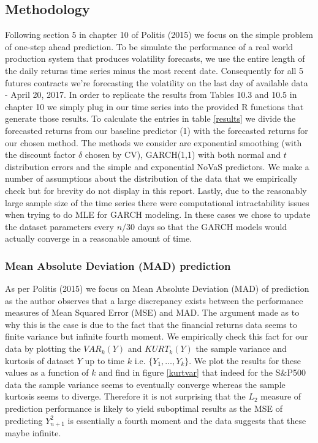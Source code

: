 \documentclass[11pt,]{article}
\begin{document}
\subsection{Methodology}

Following section 5 in chapter 10 of Politis (2015) \cite{Politis2015} we focus on the simple problem of one-step ahead prediction. To be simulate the performance of a real world production system that produces volatility forecasts, we use the entire length of the daily returns time series minus the most recent date. Consequently for all 5 futures contracts we're forecasting the volatility on the last day of available data - April 20, 2017. In order to replicate the results from Tables 10.3 and 10.5 in chapter 10 we simply plug in our time series into the provided R functions that generate those results. To calculate the entries in table \ref{results} we divide the forecasted returns from our baseline predictor (1) with the forecasted returns for our chosen method. The methods we consider are exponential smoothing (with the discount factor $\delta$ chosen by CV), GARCH(1,1) with both normal and $t$ distribution errors and the simple and exponential NoVaS predictors. We make a number of assumptions about the distribution of the data that we empirically check but for brevity do not display in this report. Lastly, due to the reasonably large sample size of the time series there were computational intractability issues when trying to do MLE for GARCH modeling. In these cases we chose to update the dataset parameters every $n/30$ days so that the GARCH models would actually converge in a reasonable amount of time.   

\subsubsection{Mean Absolute Deviation (MAD) prediction}

As per Politis (2015) \cite{Politis2015} we focus on Mean Absolute Deviation (MAD) of prediction as the author observes that a large discrepancy exists between the performance measures of Mean Squared Error (MSE) and MAD. The argument made as to why this is the case is due to the fact that the financial returns data seems to finite variance but infinite fourth moment. We empirically check this fact for our data by plotting the $VAR_k(Y)$ and $KURT_k(Y)$ the sample variance and kurtosis of dataset $Y$ up to time $k$ i.e. $\{Y_1,\dots,Y_k\}$. We plot the results for these values as a function of $k$ and find in figure \ref{kurtvar} that indeed for the S$\&$P500 data the sample variance seems to eventually converge whereas the sample kurtosis seems to diverge. Therefore it is not surprising that the $L_2$ measure of prediction performance is likely to yield suboptimal results as the MSE of predicting $Y_{n+1}^2$ is essentially a fourth moment and the data suggests that these maybe infinite. 
\end{document}
